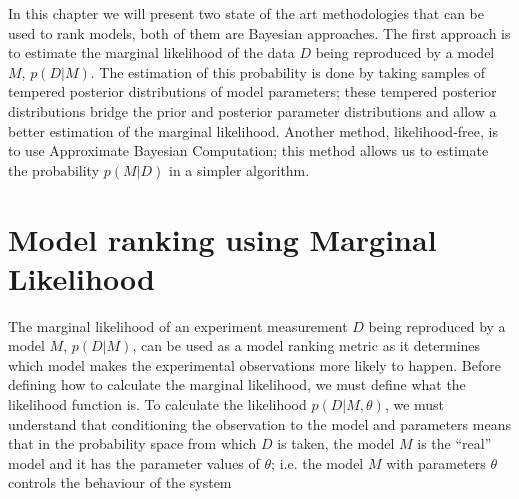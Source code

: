 
In this chapter we will present two state of the art methodologies that 
can be used to rank models, both of them are Bayesian approaches. The
first approach is to estimate the marginal likelihood of the data $D$ 
being reproduced by a model $M$, $p (D | M)$. The estimation of this 
probability is done by taking samples of tempered posterior 
distributions of model parameters; these tempered posterior 
distributions bridge the prior and posterior parameter distributions and 
allow a better estimation of the marginal likelihood. Another method,
likelihood-free, is to use Approximate Bayesian Computation; this method
allows us to estimate the probability $p (M | D)$ in a simpler 
algorithm.

\section{Model ranking using Marginal Likelihood}
The marginal likelihood of an experiment measurement $D$ being 
reproduced by a model $M$, $p (D | M)$, can be used as a model ranking 
metric as it determines which model makes the experimental observations 
more likely to happen. Before defining how to calculate the marginal 
likelihood, we must define what the likelihood function is. To calculate 
the likelihood $p (D | M, \theta)$, we must understand that conditioning 
the observation to the model and parameters means that in 
the probability space from which $D$ is taken, the model $M$ is the 
``real'' model and it has the parameter values of $\theta$; i.e. the 
model $M$ with parameters $\theta$ controls the behaviour of the system 
